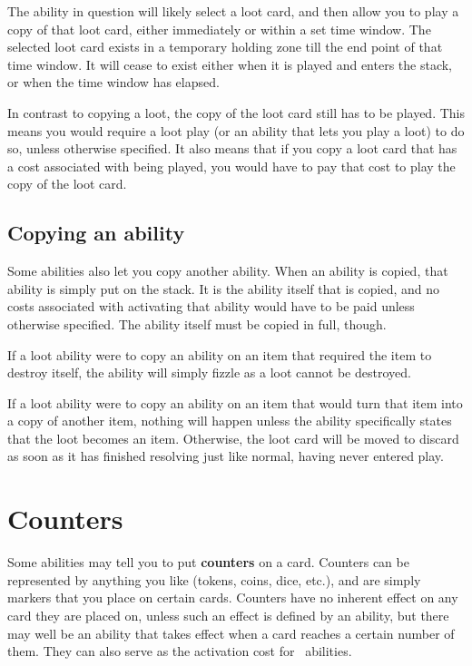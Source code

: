 \documentclass[
  fontsize=10pt,
  paper=a5,
  version=last,
  chapterprefix=true,
  bindingoffset=5mm,
  ]{scrbook}
\newcommand*{\inlineicon}[1]{%
    \raisebox{-.3\baselineskip}{%
        \smash{%
            \texttt{[image: \#1]}%
        }%
    }%
}
\newcommand{\pay}{\inlineicon{./assets/ms-paid.png}}
\begin{document}
    The ability in question will likely select a loot card, and then allow you to play a copy of that loot card, either immediately or within a set time window. The selected loot card exists in a temporary holding zone till the end point of that time window. It will cease to exist either when it is played and enters the stack, or when the time window has elapsed.

    In contrast to copying a loot, the copy of the loot card still has to be played. This means you would require a loot play (or an ability that lets you play a loot) to do so, unless otherwise specified. It also means that if you copy a loot card that has a cost associated with being played, you would have to pay that cost to play the copy of the loot card.
    \subsection*{Copying an ability}
    Some abilities also let you copy another ability. When an ability is copied, that ability is simply put on the stack. It is the ability itself that is copied, and no costs associated with activating that ability would have to be paid unless otherwise specified. The ability itself must be copied in full, though.

    If a loot ability were to copy an ability on an item that required the item to destroy itself, the ability will simply fizzle as a loot cannot be destroyed.

    If a loot ability were to copy an ability on an item that would turn that item into a copy of another item, nothing will happen unless the ability specifically states that the loot becomes an item. Otherwise, the loot card will be moved to discard as soon as it has finished resolving just like normal, having never entered play.
    \section{Counters}
    \label{counters}
    Some abilities may tell you to put \textbf{counters} on a card. Counters can be represented by anything you like (tokens, coins, dice, etc.), and are simply markers that you place on certain cards. Counters have no inherent effect on any card they are placed on, unless such an effect is defined by an ability, but there may well be an ability that takes effect when a card reaches a certain number of them. They can also serve as the activation cost for \pay\ abilities.
\end{document}
